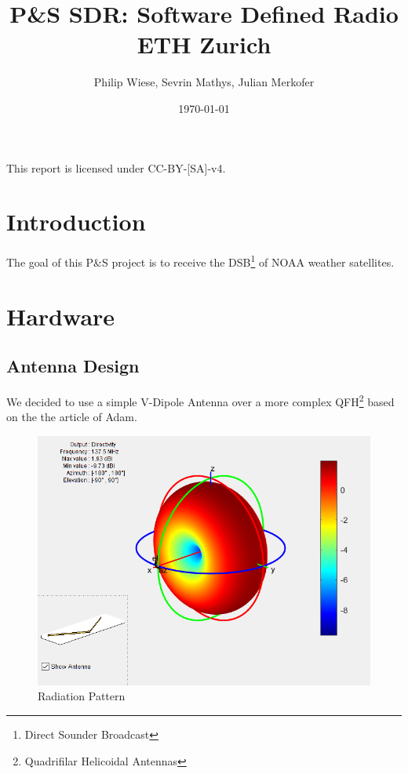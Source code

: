 \documentclass[11pt]{article}
\title{P\&S SDR: Software Defined Radio\\ ETH Zurich}
\author{Philip Wiese, Sevrin Mathys, Julian Merkofer}
\date{\today}
\begin{document}
\maketitle

\thispagestyle{empty}
\vspace{12cm}
\begin{center}
	This report is licensed under CC-BY-[SA]-v4.
\end{center}

\newpage
\tableofcontents

\pagebreak
\section{Introduction}
The goal of this P\&S project is to receive the DSB\footnote{Direct Sounder Broadcast} of NOAA weather satellites. 

\section{Hardware}

\subsection{Antenna Design}
We decided to use a simple V-Dipole Antenna over a more complex QFH\footnote{Quadrifilar Helicoidal Antennas} based on the the article\cite{Adam-9A4QV:2015} of Adam.

\begin{figure}[H]
	\begin{center}
		\includegraphics[scale=0.5]{img/Radiation3D.png}
		\caption{Radiation Pattern}
		\label{img_state}
	\end{center}
\end{figure}
\end{document}
